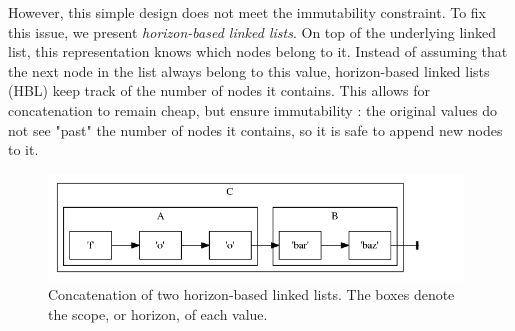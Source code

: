 \documentclass[twoside,11pt,a4paper]{article}
\newcommand{\pls}[1]{\texttt{#1}}
\newcommand{\plstype}[1]{\pls{#1}}
\newcommand{\varchar}{\plstype{VARCHAR2}}
\begin{document}
However, this simple design does not meet the immutability constraint. To fix this issue, we present \textit{horizon-based linked lists}. On top of the underlying linked list, this representation knows which nodes belong to it. Instead of assuming that the next node in the list always belong to this value, horizon-based linked lists (HBL) keep track of the number of nodes it contains. This allows for concatenation to remain cheap, but ensure immutability : the original values do not see "past" the number of nodes it contains, so it is safe to append new nodes to it.







\begin{figure}[h]
	\centering
	\includegraphics[width=11cm]{./graphs/hblconcat.png}
	\caption[Concatenation of two horizon-based linked lists]{Concatenation of two horizon-based linked lists. The boxes denote the scope, or horizon, of each value.}
	\label{fig:hblconcat}
\end{figure}
\end{document}
